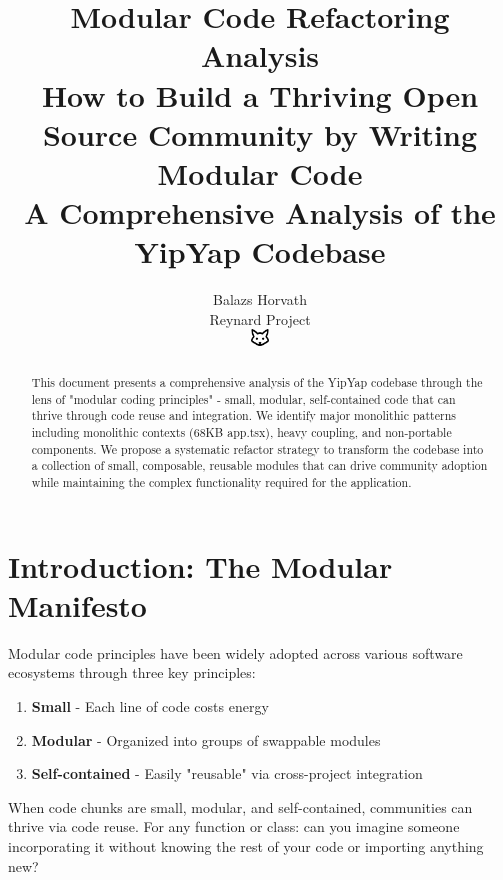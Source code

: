 \documentclass[11pt]{article}
\begin{document}
\title{\textbf{Modular Code Refactoring Analysis} \\
\Large{How to Build a Thriving Open Source Community by Writing Modular Code} \\
\large{A Comprehensive Analysis of the YipYap Codebase}}

\author{Balazs Horvath\\
Reynard Project\\
\includegraphics[width=0.5cm]{../../shared-assets/favicon.pdf}}

\maketitle

\begin{abstract}
This document presents a comprehensive analysis of the YipYap codebase through the lens of "modular coding principles" - small, modular, self-contained code that can thrive through code reuse and integration. We identify major monolithic patterns including monolithic contexts (68KB app.tsx), heavy coupling, and non-portable components. We propose a systematic refactor strategy to transform the codebase into a collection of small, composable, reusable modules that can drive community adoption while maintaining the complex functionality required for the application.
\end{abstract}

\tableofcontents
\newpage

\section{Introduction: The Modular Manifesto}

Modular code principles have been widely adopted across various software ecosystems through three key principles:

\begin{enumerate}
\item \textbf{Small} - Each line of code costs energy
\item \textbf{Modular} - Organized into groups of swappable modules  
\item \textbf{Self-contained} - Easily "reusable" via cross-project integration
\end{enumerate}

When code chunks are small, modular, and self-contained, communities can thrive via code reuse. For any function or class: can you imagine someone incorporating it without knowing the rest of your code or importing anything new?
\end{document}
